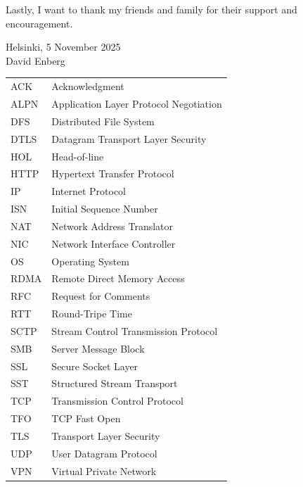 \documentclass[english, 12pt, a4paper, elec, utf8, a-2b, online]{aaltothesis}
\begin{document}
\noindent Lastly, I want to thank my friends and family for their support and encouragement.

\vspace{5cm}
Helsinki, 5 November 2025\\

\vspace{5mm}
{\hfill David Enberg \hspace{1cm}}

\newpage


\thesistableofcontents



\begin{tabular}{ll}
ACK & Acknowledgment \\
ALPN & Application Layer Protocol Negotiation \\
DFS & Distributed File System \\
DTLS & Datagram Transport Layer Security \\
HOL & Head-of-line \\
HTTP & Hypertext Transfer Protocol \\
IP & Internet Protocol \\
ISN & Initial Sequence Number \\
NAT & Network Address Translator \\
NIC & Network Interface Controller \\
OS & Operating System \\
RDMA & Remote Direct Memory Access \\
RFC & Request for Comments \\
RTT & Round-Tripe Time \\
SCTP & Stream Control Transmission Protocol \\
SMB & Server Message Block \\
SSL & Secure Socket Layer \\
SST & Structured Stream Transport \\
TCP & Transmission Control Protocol \\
TFO & TCP Fast Open \\
TLS & Transport Layer Security \\
UDP & User Datagram Protocol \\
VPN & Virtual Private Network \\
\end{tabular}


\cleardoublepage
\end{document}
